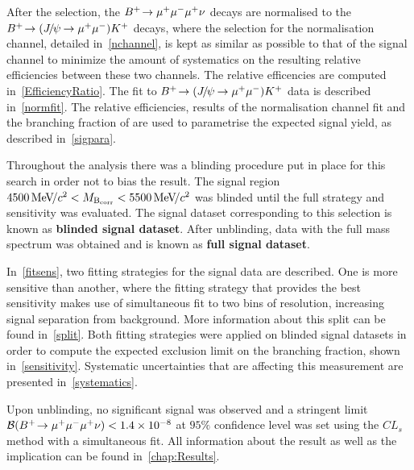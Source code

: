 After the selection, the ${{{B}^+}}\!\rightarrow {\ensuremath{\mu^+\mu^-\mu^+}}\nu$ decays are normalised to the ${{{B}^+}}\!\rightarrow ({{J\mskip -3mu/\mskip -2mu\psi\mskip 2mu}}\!\rightarrow {\ensuremath{\mu^+\mu^-}}){{K}^+}$ decays, where the selection for the normalisation channel, detailed in~\autoref{nchannel}, is kept as similar as possible to that of the signal channel to minimize the amount of systematics on the resulting relative efficiencies between these two channels. The relative efficencies are computed in~\autoref{EfficiencyRatio}. The fit to ${{{B}^+}}\!\rightarrow ({{J\mskip -3mu/\mskip -2mu\psi\mskip 2mu}}\!\rightarrow {\ensuremath{\mu^+\mu^-}}){{K}^+}$ data is described in~\autoref{normfit}. The relative efficiencies, results of the normalisation channel fit and the branching fraction of \bjpsimumuk are used to parametrise the expected signal yield, as described in~\autoref{sigpara}.



Throughout the analysis there was a blinding procedure put in place for this search in order not to bias the result. The signal region $4500{{\mathrm{\,Me\kern -0.1em V\!/}c^2}}<M_{\rm{B_{corr}}}<{5500{\mathrm{\,Me\kern -0.1em V\!/}c^2}}$ was blinded until the full strategy and sensitivity was evaluated. The signal dataset corresponding to this selection is known as \textbf{blinded signal dataset}. After unblinding, data with the full mass spectrum was obtained and is known as \textbf{full signal dataset}.%



In~\autoref{fitsens}, two fitting strategies for the signal data are described. One is more sensitive than another, where the fitting strategy that provides the best sensitivity makes use of simultaneous fit to two bins of resolution, increasing signal separation from background. More information about this split can be found in~\autoref{split}. Both fitting strategies were applied on blinded signal datasets in order to compute the expected exclusion limit on the branching fraction, shown in~\autoref{sensitivity}. Systematic uncertainties that are affecting this measurement are presented in~\autoref{systematics}.


Upon unblinding, no significant signal was observed and a stringent limit $\mathcal{B}({{{B}^+}}\!\rightarrow {\ensuremath{\mu^+\mu^-\mu^+}}\nu) < 1.4\times 10^{-8}$ at $95\%$ confidence level was set using the $CL_{s}$ method with a simultaneous fit. All information about the result as well as the implication can be found in~\autoref{chap:Results}.%



